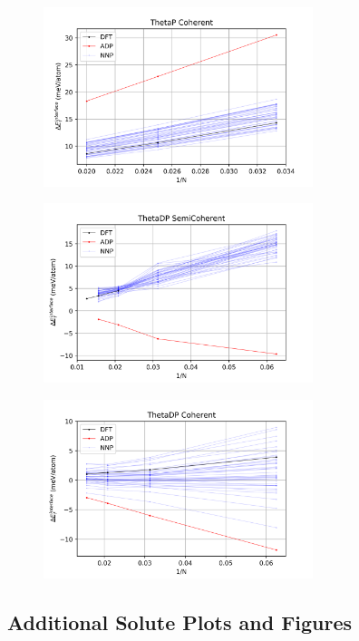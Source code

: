 \documentclass{article}
\begin{document}
\begin{figure}[H]%
\centering%
\includegraphics[width=0.7\textwidth,center]{figures/InterfaceSlope_ThetaP_Coherent.png}%
\end{figure}

\begin{figure}[H]%
\centering%
\includegraphics[width=0.7\textwidth,center]{figures/InterfaceSlope_ThetaDP_SemiCoherent.png}%
\end{figure}

\begin{figure}[H]%
\centering%
\includegraphics[width=0.7\textwidth,center]{figures/InterfaceSlope_ThetaDP_Coherent.png}%
\end{figure}


\subsection{Additional Solute Plots and Figures} \label{sct:adn_solsol}
\end{document}
